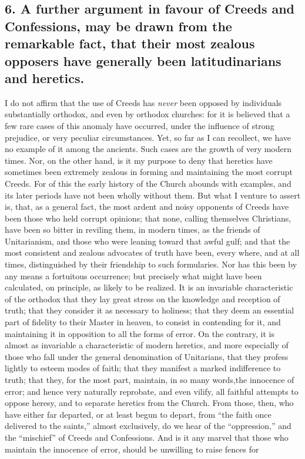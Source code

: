 \documentclass[
]{book}
\begin{document}
\hypertarget{a-further-argument-in-favour-of-creeds-and-confessions-may-be-drawn-from-the-remarkable-fact-that-their-most-zealous-opposers-have-generally-been-latitudinarians-and-heretics.}{%
\subsection{6. A further argument in favour of Creeds and Confessions, may be drawn from the remarkable fact, that their most zealous opposers have generally been latitudinarians and heretics.}\label{a-further-argument-in-favour-of-creeds-and-confessions-may-be-drawn-from-the-remarkable-fact-that-their-most-zealous-opposers-have-generally-been-latitudinarians-and-heretics.}}

I do not affirm that the use of Creeds has \emph{never} been opposed by individuals substantially orthodox, and even by orthodox churches: for it is believed that a few rare cases of this anomaly have occurred, under the influence of strong prejudice, or very peculiar circumstances. Yet, so far as I can recollect, we have no example of it among the ancients. Such cases are the growth of very modern times. Nor, on the other hand, is it my purpose to deny that heretics have sometimes been extremely zealous in forming and maintaining the most corrupt Creeds. For of this the early history of the Church abounds with examples, and its later periods have not been wholly without them. But what I venture to assert is, that, as a general fact, the most ardent and noisy opponents of Creeds have been those who held corrupt opinions; that none, calling themselves Christians, have been so bitter in reviling them, in modern times, as the friends of Unitarianism, and those who were leaning toward that awful gulf; and that the most consistent and zealous advocates of truth have been, every where, and at all times, distinguished by their friendship to such formularies. Nor has this been by any means a fortuitous occurrence; but precisely what might have been calculated, on principle, as likely to be realized. It is an invariable characteristic of the orthodox that they lay great stress on the knowledge and reception of truth; that they consider it as necessary to holiness; that they deem an essential part of fidelity to their Master in heaven, to consist in contending for it, and maintaining it in opposition to all the forms of error. On the contrary, it is almost as invariable a characteristic of modern heretics, and more especially of those who fall under the general denomination of Unitarians, that they profess lightly to esteem modes of faith; that they manifest a marked indifference to truth; that they, for the most part, maintain, in so many words,the innocence of error; and hence very naturally reprobate, and even vilify, all faithful attempts to oppose heresy, and to separate heretics from the Church. From those, then, who have either far departed, or at least begun to depart, from ``the faith once delivered to the saints,'' almost exclusively, do we hear of the ``oppression,'' and the ``mischief'' of Creeds and Confessions. And is it any marvel that those who maintain the innocence of error, should be unwilling to raise fences for
\end{document}

